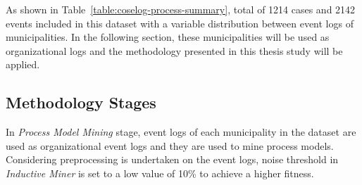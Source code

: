 As shown in Table~\ref{table:coselog-process-summary}, total of 1214 cases and 2142 events included in this dataset with a variable distribution between event logs of municipalities. In the following section, these municipalities will be used as organizational logs and the methodology presented in this thesis study will be applied.

\subsection{Methodology Stages}
\label{sec:coselog-methodology}
In \textit{Process Model Mining} stage, event logs of each municipality in the dataset are used as organizational event logs and they are used to mine process models. Considering preprocessing is undertaken on the event logs, noise threshold in \textit{Inductive Miner} is set to a low value of 10\% to achieve a higher fitness. 

